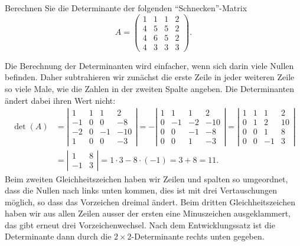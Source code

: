 Berechnen Sie die Determinante der folgenden ``Schnecken''-Matrix
\[
A=
\begin{pmatrix}
1&1&1&2\\
4&5&5&2\\
4&6&5&2\\
4&3&3&3
\end{pmatrix}.
\]

\begin{loesung}
Die Berechnung der Determinanten wird einfacher, wenn sich darin viele
Nullen befinden.
Daher subtrahieren wir zunächst die erste Zeile in jeder weiteren Zeile
so viele Male, wie die Zahlen in der zweiten Spalte angeben.
Die Determinanten ändert dabei ihren Wert nicht:
\begin{align*}
\det(A)
&=
\left|
\begin{matrix}
1&1&1&2\\
-1&0&0&-8\\
-2&0&-1&-10\\
1&0&0&-3
\end{matrix}\right|
=
-
\left|
\begin{matrix}
1& 1& 1&  2\\
0&-1&-2&-10\\
0& 0&-1& -8\\
0& 0& 1& -3
\end{matrix}\right|
=
\left|
\begin{matrix}
1& 1& 1&  2\\
0& 1& 2& 10\\
0& 0& 1&  8\\
0& 0&-1&  3
\end{matrix}\right|
\\
&=
\left|
\begin{matrix}
1&8\\-1&3
\end{matrix}\right|
=1\cdot 3-8\cdot(-1)=3+8=11.
\end{align*}
Beim zweiten Gleichheitszeichen haben wir Zeilen und spalten so umgeordnet,
dass die Nullen nach links unten kommen, dies ist mit drei Vertauschungen
möglich, so dass das Vorzeichen dreimal ändert.
Beim dritten Gleichheitszeichen haben wir aus allen Zeilen ausser der ersten
eine Minuszeichen ausgeklammert, das gibt erneut drei Vorzeichenwechsel.
Nach dem Entwicklungssatz ist die Determinante dann durch die
$2\times 2$-Determinante rechts unten gegeben.


\end{loesung}
